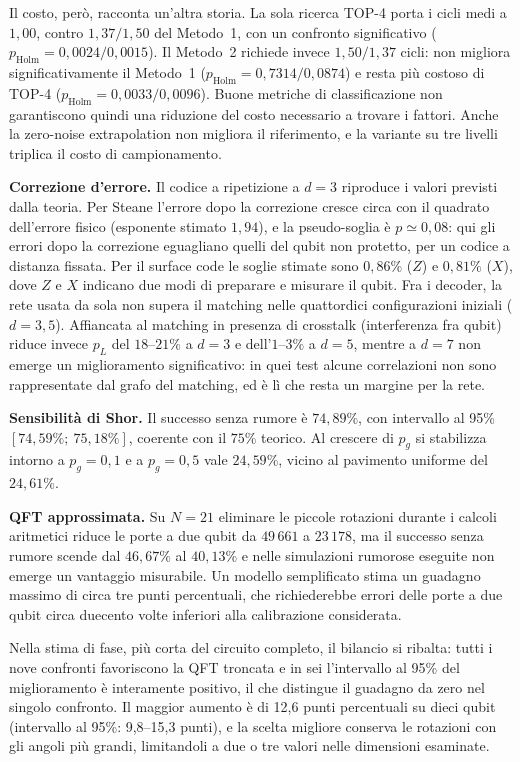 Il costo, però, racconta un'altra storia.
La sola ricerca TOP-4 porta i cicli medi a $1{,}00$, contro $1{,}37/1{,}50$ del
Metodo~1, con un confronto significativo ($p_{\mathrm{Holm}}=0{,}0024/0{,}0015$).
Il Metodo~2 richiede invece $1{,}50/1{,}37$ cicli: non migliora
significativamente il Metodo~1 ($p_{\mathrm{Holm}}=0{,}7314/0{,}0874$) e resta
più costoso di TOP-4 ($p_{\mathrm{Holm}}=0{,}0033/0{,}0096$).
Buone metriche di classificazione non garantiscono quindi una riduzione del costo
necessario a trovare i fattori.
Anche la zero-noise extrapolation non migliora il riferimento, e la variante su
tre livelli triplica il costo di campionamento.

\textbf{Correzione d'errore.} Il codice a ripetizione a $d=3$ riproduce i valori
previsti dalla teoria.
Per Steane l'errore dopo la correzione cresce circa con il quadrato dell'errore
fisico (esponente stimato $1{,}94$), e la pseudo-soglia è $p\simeq0{,}08$: qui
gli errori dopo la correzione eguagliano quelli del qubit non protetto, per un
codice a distanza fissata.
Per il surface code le soglie stimate sono $0{,}86\%$ ($Z$) e $0{,}81\%$ ($X$),
dove $Z$ e $X$ indicano due modi di preparare e misurare il qubit.
Fra i decoder, la rete usata da sola non supera il matching nelle quattordici
configurazioni iniziali ($d=3,5$).
Affiancata al matching in presenza di crosstalk (interferenza fra qubit) riduce
invece $p_L$ del $18$--$21\%$ a $d=3$ e dell'$1$--$3\%$ a $d=5$, mentre a $d=7$
non emerge un miglioramento significativo: in quei test alcune correlazioni non
sono rappresentate dal grafo del matching, ed è lì che resta un margine per la
rete.

\textbf{Sensibilità di Shor.} Il successo senza rumore è $74{,}89\%$, con
intervallo al 95\% $[74{,}59\%;\ 75{,}18\%]$, coerente con il $75\%$ teorico.
Al crescere di $p_g$ si stabilizza intorno a $p_g=0{,}1$ e a $p_g=0{,}5$ vale
$24{,}59\%$, vicino al pavimento uniforme del $24{,}61\%$.

\textbf{QFT approssimata.} Su $N=21$ eliminare le piccole rotazioni durante i
calcoli aritmetici riduce le porte a due qubit da $49\,661$ a $23\,178$, ma il
successo senza rumore scende dal $46{,}67\%$ al $40{,}13\%$ e nelle simulazioni
rumorose eseguite non emerge un vantaggio misurabile.
Un modello semplificato stima un guadagno massimo di circa tre punti percentuali,
che richiederebbe errori delle porte a due qubit circa duecento volte inferiori
alla calibrazione considerata.

Nella stima di fase, più corta del circuito completo, il bilancio si ribalta:
tutti i nove confronti favoriscono la QFT troncata e in sei l'intervallo al 95\%
del miglioramento è interamente positivo, il che distingue il guadagno da zero
nel singolo confronto.
Il maggior aumento è di 12,6 punti percentuali su dieci qubit (intervallo al
95\%: 9,8--15,3 punti), e la scelta migliore conserva le rotazioni con gli angoli
più grandi, limitandoli a due o tre valori nelle dimensioni esaminate.

